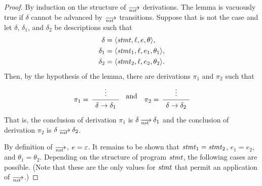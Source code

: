 
\lemdetnst*
\begin{proof}
  By induction on the structure of $\nst$ derivations.  The lemma is
  vacuously true if $\delta$ cannot be advanced by $\nst$ transitions.
  Suppose that is not the case and let $\delta$, $\delta_1$, and $\delta_2$
  be descriptions such that
  \begin{align*}
    \delta  &=\<\stmt,\ell,e,\theta>,\\
    \delta_1&=\<\stmt_1,\ell,e_1,\theta_1>,\\
    \delta_2&=\<\stmt_2,\ell,e_2,\theta_2>.
  \end{align*}
  Then, by the hypothesis of the lemma, there are derivations $\pi_1$
  and $\pi_2$ such that
  \[
    \AxiomC{\strut$\vdots$}
    \LeftLabel{\strut$\pi_1=\null$}
    \UnaryInfC{\strut$\delta\to\delta_1$}
    \DisplayProof
    \quad\text{and}\quad
    \AxiomC{\strut$\vdots$}
    \LeftLabel{\strut$\pi_2=\null$}
    \UnaryInfC{\strut$\delta\to\delta_2$}
    \DisplayProof
  \]
  That is, the conclusion of derivation $\pi_1$ is $\delta\nst\delta_1$ and
  the conclusion of derivation $\pi_2$ is $\delta\nst\delta_2$.

  By definition of $\nst$, $e=\varepsilon$.  It remains to be shown that
  $\mathit{stmt}_1=\mathit{stmt}_2$, $e_1=e_2$, and $\theta_1=\theta_2$.  Depending on the
  structure of program $\mathit{stmt}$, the following cases are possible.  (Note
  that these are the only values for $\mathit{stmt}$ that permit an application of
  $\nst$.)


\end{proof}
